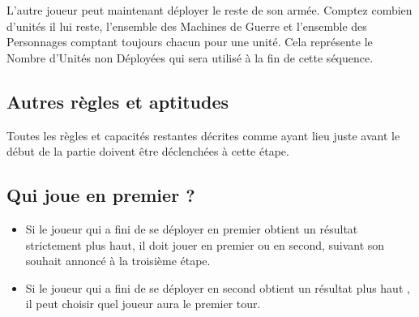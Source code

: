 L'autre joueur peut maintenant déployer le reste de son armée. Comptez combien d'unités il lui reste, l'ensemble des Machines de Guerre et l'ensemble des Personnages comptant toujours chacun pour une unité. Cela représente le \og Nombre d'Unités non Déployées \fg{} qui sera utilisé à la fin de cette séquence.

\subsection{Autres règles et aptitudes}

Toutes les règles et capacités restantes décrites comme ayant lieu juste avant le début de la partie doivent être déclenchées à cette étape.

\subsection{Qui joue en premier ?}

\begin{itemize}[label={-}]
\item Si le joueur qui a fini de se déployer en premier obtient un résultat strictement plus haut, il doit jouer en premier ou en second, suivant son souhait annoncé à la troisième étape.
\item Si le joueur qui a fini de se déployer en second obtient un résultat plus haut , il peut choisir quel joueur aura le premier tour.
\end{itemize}

